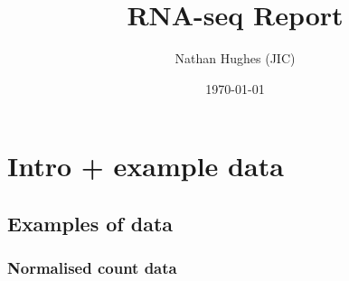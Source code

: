 \documentclass[a4paper]{article}
\author{Nathan Hughes (JIC)}
\date{\today}
\title{RNA-seq Report}
\begin{document}
\maketitle
\maketitle
\clearpage
\tableofcontents
\clearpage



\section{Intro + example data}
\label{sec:orga9cbabb}


\subsection{Examples of data}
\label{sec:orgfc96b3e}

\subsubsection{Normalised count data}
\label{sec:orgffc340f}
\end{document}
